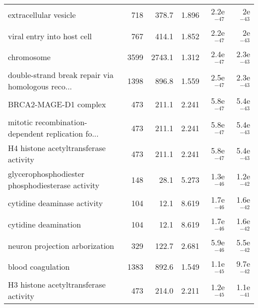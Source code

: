 \begin{longtable}{lrrrrr}
                             extracellular vesicle &                     718 &                   378.7 &      1.896 &         2.2e$^{-47}$ &           2e$^{-43}$ \\
                        viral entry into host cell &                     767 &                   414.1 &      1.852 &         2.2e$^{-47}$ &           2e$^{-43}$ \\
                                        chromosome &                    3599 &                  2743.1 &      1.312 &         2.4e$^{-47}$ &         2.3e$^{-43}$ \\
 double-strand break repair via homologous reco... &                    1398 &                   896.8 &      1.559 &         2.5e$^{-47}$ &         2.3e$^{-43}$ \\
                             BRCA2-MAGE-D1 complex &                     473 &                   211.1 &      2.241 &         5.8e$^{-47}$ &         5.4e$^{-43}$ \\
 mitotic recombination-dependent replication fo... &                     473 &                   211.1 &      2.241 &         5.8e$^{-47}$ &         5.4e$^{-43}$ \\
             H4 histone acetyltransferase activity &                     473 &                   211.1 &      2.241 &         5.8e$^{-47}$ &         5.4e$^{-43}$ \\
  glycerophosphodiester phosphodiesterase activity &                     148 &                    28.1 &      5.273 &         1.3e$^{-46}$ &         1.2e$^{-42}$ \\
                       cytidine deaminase activity &                     104 &                    12.1 &      8.619 &         1.7e$^{-46}$ &         1.6e$^{-42}$ \\
                              cytidine deamination &                     104 &                    12.1 &      8.619 &         1.7e$^{-46}$ &         1.6e$^{-42}$ \\
                    neuron projection arborization &                     329 &                   122.7 &      2.681 &         5.9e$^{-46}$ &         5.5e$^{-42}$ \\
                                 blood coagulation &                    1383 &                   892.6 &      1.549 &         1.1e$^{-45}$ &         9.7e$^{-42}$ \\
             H3 histone acetyltransferase activity &                     473 &                   214.0 &      2.211 &         1.2e$^{-45}$ &         1.1e$^{-41}$ \\

\end{longtable}
